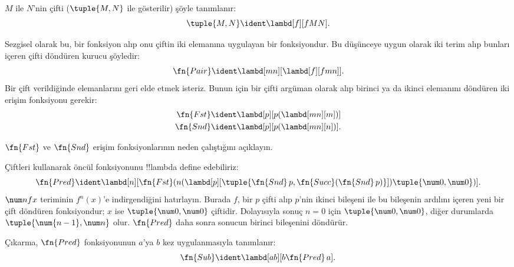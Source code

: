 \documentclass[../../../include/open-logic-section]{subfiles}
\begin{document}

\begin{defn}
$M$ ile $N$'nin çifti ($\tuple{M,N}$ ile gösterilir) şöyle tanımlanır:
\[
\tuple{M,N} \ident \lambd[f][fMN].
\]
\end{defn}

Sezgisel olarak bu, bir fonksiyon alıp onu çiftin iki elemanına uygulayan bir
fonksiyondur. Bu düşünceye uygun olarak iki terim alıp bunları içeren çifti
döndüren kurucu şöyledir:
\[
  \fn{Pair} \ident \lambd[mn][\lambd[f][fmn]].
\]
Bir çift verildiğinde elemanlarını geri elde etmek isteriz. Bunun için bir
çifti argüman olarak alıp birinci ya da ikinci elemanını döndüren iki erişim
fonksiyonu gerekir:
\begin{align*}
  \fn{Fst} & \ident \lambd[p][p(\lambd[mn][m])]\\
  \fn{Snd} & \ident \lambd[p][p(\lambd[mn][n])].
\end{align*}

\begin{prob}
  $\fn{Fst}$ ve $\fn{Snd}$ erişim fonksiyonlarının neden çalıştığını
  açıklayın.
\end{prob}

Çiftleri kullanarak öncül fonksiyonunu !!{lambda define} edebiliriz:
\[
  \fn{Pred} \ident \lambd[n][\fn{Fst}(n (\lambd[p][\tuple{\fn{Snd}\, {p}, \fn{Succ}(\fn{Snd}\, {p})}]) \tuple{\num 0, \num 0})].
\]
$\num n f x$ teriminin $f^n(x)$'e indirgendiğini hatırlayın. Burada $f$, bir
$p$ çifti alıp $p$'nin ikinci bileşeni ile bu bileşenin ardılını içeren yeni
bir çift döndüren fonksiyondur; $x$ ise $\tuple{\num0,\num0}$ çiftidir.
Dolayısıyla sonuç $n=0$ için $\tuple{\num0,\num0}$, diğer durumlarda
$\tuple{\num{n-1},\num n}$ olur. $\fn{Pred}$ daha sonra sonucun birinci
bileşenini döndürür.

Çıkarma, $\fn{Pred}$ fonksiyonunun $a$'ya $b$ kez uygulanmasıyla tanımlanır:
\[
\fn{Sub} \ident \lambd[ab][b \fn{Pred}\, a].
\]
\end{document}
